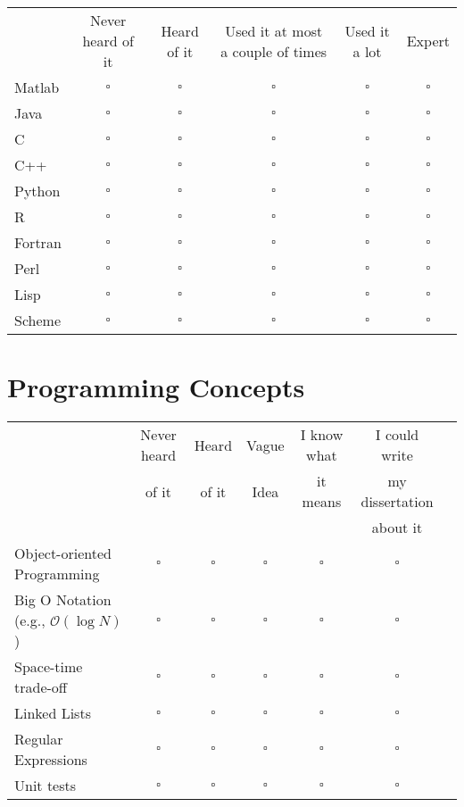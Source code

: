 \documentclass[article,twoside]{memoir}
\newcommand*{\bigO}{\mathcal{O}}
\newcommand*{\checkbox}{$\square$}
\begin{document}
\def\th#1{#1}
\begin{tabular}{lccccc}
 & \th{Never heard of it} & \th{Heard of it} & \th{Used it at most a couple of times} & \th{Used it a lot} & \th{Expert}\\
Matlab  &\checkbox &\checkbox &\checkbox &\checkbox &\checkbox \\
Java    &\checkbox &\checkbox &\checkbox &\checkbox &\checkbox \\
C       &\checkbox &\checkbox &\checkbox &\checkbox &\checkbox \\
C++     &\checkbox &\checkbox &\checkbox &\checkbox &\checkbox \\
Python  &\checkbox &\checkbox &\checkbox &\checkbox &\checkbox \\
R       &\checkbox &\checkbox &\checkbox &\checkbox &\checkbox \\
Fortran &\checkbox &\checkbox &\checkbox &\checkbox &\checkbox \\
Perl    &\checkbox &\checkbox &\checkbox &\checkbox &\checkbox \\
Lisp    &\checkbox &\checkbox &\checkbox &\checkbox &\checkbox \\
Scheme  &\checkbox &\checkbox &\checkbox &\checkbox &\checkbox \\
\end{tabular}

\section{Programming Concepts}
\begin{tabular}{lcccccc}
 \toprule
 & Never heard & Heard & Vague & I know what & I could write \\
 & of it & of it & Idea& it means& my dissertation \\
 & & & & & about it\\
 \midrule
Object-oriented Programming            &\checkbox &\checkbox &\checkbox &\checkbox &\checkbox \\
Big O Notation (e.g., $\bigO(\log N)$) &\checkbox &\checkbox &\checkbox &\checkbox &\checkbox \\
Space-time trade-off                   &\checkbox &\checkbox &\checkbox &\checkbox &\checkbox \\
Linked Lists                           &\checkbox &\checkbox &\checkbox &\checkbox &\checkbox \\
Regular Expressions                    &\checkbox &\checkbox &\checkbox &\checkbox &\checkbox \\
Unit tests                             &\checkbox &\checkbox &\checkbox &\checkbox &\checkbox \\
\end{tabular}
\end{document}
